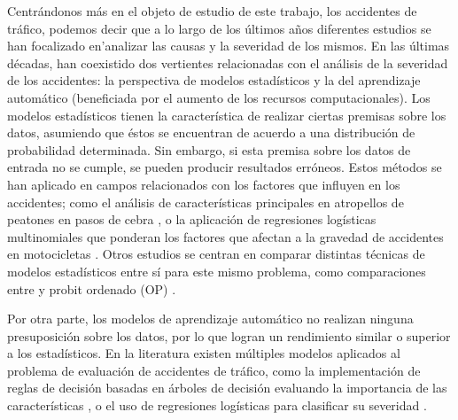 Centrándonos más en el objeto de estudio de este trabajo, los accidentes de tráfico, podemos decir que a lo largo de los últimos años diferentes estudios se han focalizado en'analizar las causas y la severidad de los mismos. En las últimas décadas, han coexistido dos vertientes relacionadas con el análisis de la severidad de los accidentes: la perspectiva de modelos estadísticos y la del aprendizaje automático (beneficiada por el aumento de los recursos computacionales). Los modelos estadísticos tienen la característica de realizar ciertas premisas sobre los datos, asumiendo que éstos se encuentran de acuerdo a una distribución de probabilidad determinada. Sin embargo, si esta premisa sobre los datos de entrada no se cumple, se pueden producir resultados erróneos. Estos métodos se han aplicado en campos relacionados con los factores que influyen en los accidentes; como el análisis de características principales en atropellos de peatones en pasos de cebra \cite{FactoresQueInfluyen2003}, o la aplicación de regresiones logísticas multinomiales que ponderan los factores que afectan a la gravedad de accidentes en motocicletas \cite{MotorcycleCrashesMultinominalStatistic}. Otros estudios se centran en comparar distintas técnicas de modelos estadísticos entre sí para este mismo problema, como comparaciones entre  y probit ordenado (OP) \cite{MetodosEstadisticosComparacionSVMOP}.


Por otra parte, los modelos de aprendizaje automático no realizan ninguna presuposición sobre los datos, por lo que logran un rendimiento similar o superior a los estadísticos. En la literatura existen múltiples modelos aplicados al problema de evaluación de accidentes de tráfico, como la implementación de reglas de decisión basadas en árboles de decisión evaluando la importancia de las características \cite{ArbolDecisionSeveridadDeAccidentes}, o el uso de regresiones logísticas para clasificar su severidad \cite{LogisticRegressionPrediccionAccidentes}.

